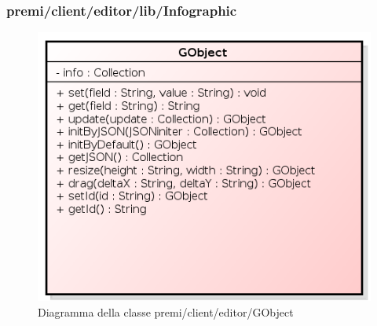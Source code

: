 \subsubsection{premi/client/editor/lib/Infographic}
\begin{figure}[h]
\begin{center}
\includegraphics[scale=0.40]{img/diacla/GObject.png}
\caption{Diagramma della classe premi/client/editor/GObject}
\end{center}
\end{figure}

